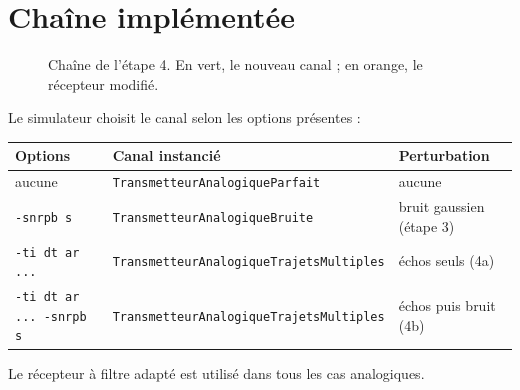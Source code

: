\documentclass[11pt,a4paper]{article}
\newcommand{\cls}[1]{\texttt{#1}}
\begin{document}
\section{Chaîne implémentée}
\begin{figure}[htbp]\centering
{}
\caption{Chaîne de l'étape 4. En vert, le nouveau canal ; en orange, le récepteur modifié.}
\end{figure}
Le simulateur choisit le canal selon les options présentes :
\begin{center}\begin{tabular}{lll}\toprule
Options & Canal instancié & Perturbation\\\midrule
aucune & \cls{TransmetteurAnalogiqueParfait} & aucune\\
\texttt{-snrpb s} & \cls{TransmetteurAnalogiqueBruite} & bruit gaussien (étape 3)\\
\texttt{-ti dt ar ...} & \cls{TransmetteurAnalogiqueTrajetsMultiples} & échos seuls (4a)\\
\texttt{-ti dt ar ... -snrpb s} & \cls{TransmetteurAnalogiqueTrajetsMultiples} & échos puis bruit (4b)\\\bottomrule
\end{tabular}\end{center}
Le récepteur à filtre adapté est utilisé dans tous les cas analogiques.
\end{document}
